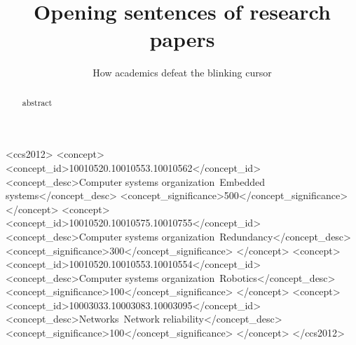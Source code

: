 \documentclass[sigconf]{acmart}
\begin{document}
	
	\title{Opening sentences of research papers	}
	\subtitle{	How academics defeat the blinking cursor }
	

	
	
	\begin{abstract}
	abstract
	\end{abstract}
	
	\begin{CCSXML}
		<ccs2012>
		<concept>
		<concept_id>10010520.10010553.10010562</concept_id>
		<concept_desc>Computer systems organization~Embedded systems</concept_desc>
		<concept_significance>500</concept_significance>
		</concept>
		<concept>
		<concept_id>10010520.10010575.10010755</concept_id>
		<concept_desc>Computer systems organization~Redundancy</concept_desc>
		<concept_significance>300</concept_significance>
		</concept>
		<concept>
		<concept_id>10010520.10010553.10010554</concept_id>
		<concept_desc>Computer systems organization~Robotics</concept_desc>
		<concept_significance>100</concept_significance>
		</concept>
		<concept>
		<concept_id>10003033.10003083.10003095</concept_id>
		<concept_desc>Networks~Network reliability</concept_desc>
		<concept_significance>100</concept_significance>
		</concept>
		</ccs2012>
	\end{CCSXML}
	

	
\end{document}
